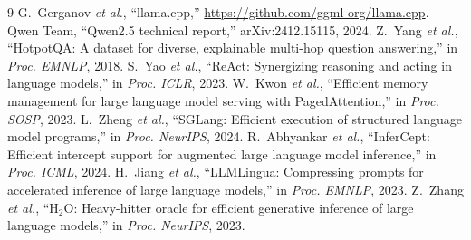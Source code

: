\documentclass[conference]{IEEEtran}
\begin{document}
\begin{thebibliography}{9}
\footnotesize
{} G.~Gerganov \emph{et al.}, ``llama.cpp,'' \url{https://github.com/ggml-org/llama.cpp}.
 Qwen Team, ``Qwen2.5 technical report,'' arXiv:2412.15115, 2024.
 Z.~Yang \emph{et al.}, ``HotpotQA: A dataset for diverse, explainable multi-hop question
answering,'' in \emph{Proc. EMNLP}, 2018.
 S.~Yao \emph{et al.}, ``ReAct: Synergizing reasoning and acting in language models,'' in
\emph{Proc. ICLR}, 2023.
 W.~Kwon \emph{et al.}, ``Efficient memory management for large language model serving with
PagedAttention,'' in \emph{Proc. SOSP}, 2023.
 L.~Zheng \emph{et al.}, ``SGLang: Efficient execution of structured language model
programs,'' in \emph{Proc. NeurIPS}, 2024.
 R.~Abhyankar \emph{et al.}, ``InferCept: Efficient intercept support for augmented
large language model inference,'' in \emph{Proc. ICML}, 2024.
 H.~Jiang \emph{et al.}, ``LLMLingua: Compressing prompts for accelerated inference of
large language models,'' in \emph{Proc. EMNLP}, 2023.
 Z.~Zhang \emph{et al.}, ``H$_2$O: Heavy-hitter oracle for efficient generative inference of
large language models,'' in \emph{Proc. NeurIPS}, 2023.
\end{thebibliography}
\end{document}
